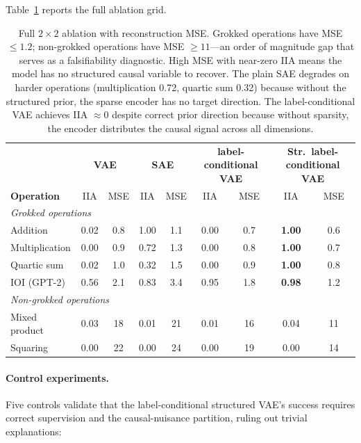 \vspace{1em}
Table~\ref{tab:ablation_full} reports the full ablation grid.

\begin{table}[H]
\centering
\small
\setlength{\tabcolsep}{3.5pt}
\renewcommand{\arraystretch}{1.15}
\begin{tabular}{@{}l|cc|cc|cc|cc@{}}
\toprule
& \multicolumn{2}{c|}{\textbf{VAE}} & \multicolumn{2}{c|}{\textbf{SAE}}
& \multicolumn{2}{c|}{\textbf{label-conditional VAE}} & \multicolumn{2}{c}{\textbf{Str.\ label-conditional VAE}} \\
\textbf{Operation} & IIA & MSE & IIA & MSE & IIA & MSE & IIA & MSE \\
\midrule
\multicolumn{9}{l}{\textit{Grokked operations}} \\
Addition        & 0.02 & 0.8 & 1.00 & 1.1  & 0.00 & 0.7  & \textbf{1.00} & 0.6 \\
Multiplication  & 0.00 & 0.9 & 0.72 & 1.3  & 0.00 & 0.8  & \textbf{1.00} & 0.7 \\
Quartic sum     & 0.02 & 1.0 & 0.32 & 1.5  & 0.00 & 0.9  & \textbf{1.00} & 0.8 \\
IOI (GPT-2)     & 0.56 & 2.1 & 0.83 & 3.4  & 0.95 & 1.8  & \textbf{0.98} & 1.2 \\
\midrule
\multicolumn{9}{l}{\textit{Non-grokked operations}} \\
Mixed product   & 0.03 & 18  & 0.01 & 21   & 0.01 & 16   & 0.04 & 11 \\
Squaring        & 0.00 & 22  & 0.00 & 24   & 0.00 & 19   & 0.00 & 14 \\
\bottomrule
\end{tabular}
\renewcommand{\arraystretch}{1.0}
\caption{Full $2 \times 2$ ablation with reconstruction MSE. Grokked operations
have MSE $\leq 1.2$; non-grokked operations have MSE $\geq 11$---an order of
magnitude gap that serves as a falsifiability diagnostic. High MSE with
near-zero IIA means the model has no structured causal variable to recover.
The plain SAE degrades on harder operations (multiplication 0.72, quartic sum
0.32) because without the structured prior, the sparse encoder has no target
direction. The label-conditional VAE achieves IIA $\approx 0$ despite correct prior direction
because without sparsity, the encoder distributes the causal signal across all
dimensions.}
\label{tab:ablation_full}
\end{table}

\paragraph{Control experiments.}
Five controls validate that the label-conditional structured VAE's success requires
correct supervision and the causal-nuisance partition, ruling out
trivial explanations:

